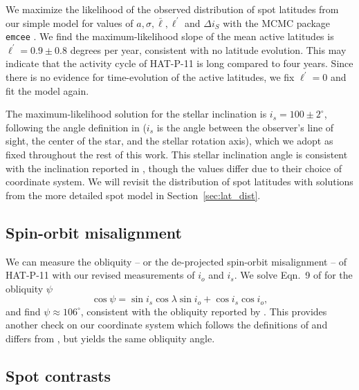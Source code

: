 We maximize the likelihood of the observed distribution of spot latitudes from our simple model for values of $a, \sigma, \bar{\ell}, \ell^\prime$ and $\Delta i_S$ with the MCMC package \texttt{emcee} \citep{Foreman-Mackey2013}. We find the maximum-likelihood slope of the mean active latitudes is $\ell^\prime = 0.9 \pm 0.8$ degrees per year, consistent with no latitude evolution. This may indicate that the activity cycle of HAT-P-11 is long compared to four years. Since there is no evidence for  time-evolution of the active latitudes, we fix $\ell^\prime = 0$ and fit the model again.

The maximum-likelihood solution for the stellar inclination is $i_s = 100 \pm 2^\circ$, following the angle definition in \citet{Fabrycky2009} ($i_s$ is the angle between the observer's line of sight, the center of the star, and the stellar rotation axis), which we adopt as fixed throughout the rest of this work. This stellar inclination angle is consistent with the inclination reported in \citet{Sanchis-Ojeda2011}, though the values differ due to their choice of coordinate system. We will revisit the distribution of spot latitudes with solutions from the more detailed spot model in Section~\ref{sec:lat_dist}.

\subsection{Spin-orbit misalignment} \label{sec:obliquity}

We can measure the obliquity -- or the de-projected spin-orbit misalignment -- of HAT-P-11 with our revised measurements of $i_o$ and $i_s$. We solve Eqn.~9 of \citet{Fabrycky2009} for the obliquity $\psi$
\begin{equation}
\cos \psi = \sin i_s \cos \lambda \sin i_o + \cos i_s \cos i_o,
\end{equation}
and find $\psi \approx 106^\circ$, consistent with the obliquity reported by \citet{Sanchis-Ojeda2011}. This provides another check on our coordinate system which follows the definitions of \citet{Fabrycky2009} and differs from \citet{Sanchis-Ojeda2011}, but yields the same obliquity angle. 

\subsection{Spot contrasts} \label{sec:contrast}

